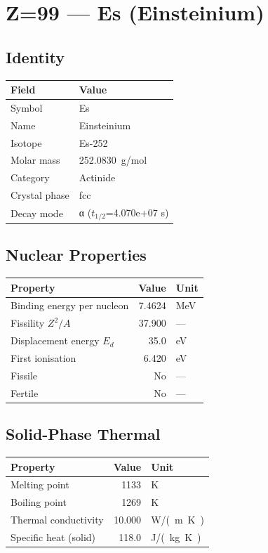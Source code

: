 \documentclass[11pt,a4paper]{article}
\begin{document}
\newpage

\section{Z=99 --- Es (Einsteinium)}
\label{sec:Z99}

\subsection{Identity}
\begin{tabular}{ll}
  \toprule
  Field & Value \\
  \midrule
  Symbol & Es \\
  Name & Einsteinium \\
  Isotope & Es-252 \\
  Molar mass & \SI{252.0830}{g/mol} \\
  Category & Actinide \\
  Crystal phase & fcc \\
  Decay mode & α ($t_{1/2}$=4.070e+07 s) \\
  \bottomrule
\end{tabular}

\subsection{Nuclear Properties}
\begin{tabular}{lrl}
  \toprule
  Property & Value & Unit \\
  \midrule
  Binding energy per nucleon & 7.4624 & \si{MeV} \\
  Fissility $Z^2/A$ & 37.900 & --- \\
  Displacement energy $E_d$ & 35.0 & \si{eV} \\
  First ionisation & 6.420 & \si{eV} \\
  Fissile & No & --- \\
  Fertile & No & --- \\
  \bottomrule
\end{tabular}

\subsection{Solid-Phase Thermal}
\begin{tabular}{lrl}
  \toprule
  Property & Value & Unit \\
  \midrule
  Melting point & 1133 & \si{K} \\
  Boiling point & 1269 & \si{K} \\
  Thermal conductivity & 10.000 & \si{W/(m.K)} \\
  Specific heat (solid) & 118.0 & \si{J/(kg.K)} \\
  \bottomrule
\end{tabular}
\end{document}
